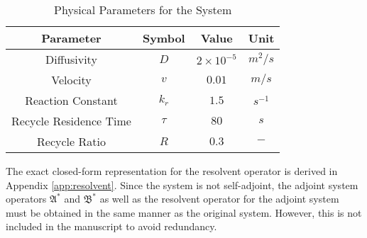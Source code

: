 \begin{table}[ht]
    \centering
    \caption{Physical Parameters for the System}
    \label{tab:pars}
    \begin{tabular}{|c|c|c|c|}
    \hline
    \textbf{Parameter}        & \textbf{Symbol} & \textbf{Value}     & \textbf{Unit}    \\ \hline
    Diffusivity               & $D$             & $2\times10^{-5}$   & ${m^2}/{s}$      \\ \hline
    Velocity                  & $v$             & $0.01$   & ${m}/{s}$        \\ \hline
    Reaction Constant         & $k_r$           & $1.5$              & $s^{-1}$         \\ \hline
    Recycle Residence Time    & $\tau$          & $80$               & $s$              \\ \hline
    Recycle Ratio             & $R$             & $0.3$              & $-$              \\ \hline
    \end{tabular}
\end{table}

The exact closed-form representation for the resolvent operator is derived in Appendix \ref{app:resolvent}. Since the system is not self-adjoint, the adjoint system operators $\mathfrak{A}^*$ and $\mathfrak{B}^*$ as well as the resolvent operator for the adjoint system must be obtained in the same manner as the original system. However, this is not included in the manuscript to avoid redundancy.